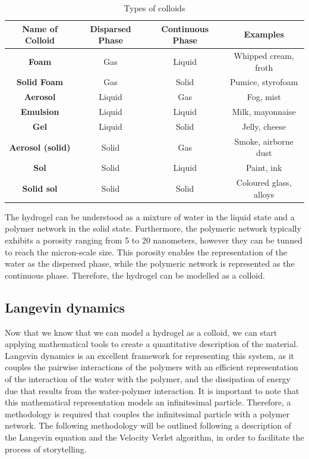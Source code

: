 \begin{table}[ht!]
\begin{tabular}{|c|c|c|c|}
\hline
\textbf{Name of Colloid} & \textbf{Disparsed Phase} & \textbf{Continuous Phase} & \textbf{Examples}      \\ \hline
\textbf{Foam}            & Gas                      & Liquid                    & Whipped cream, froth   \\ \hline
\textbf{Solid Foam}      & Gas                      & Solid                     & Pumice, styrofoam      \\ \hline
\textbf{Aerosol}         & Liquid                   & Gas                       & Fog, mist              \\ \hline
\textbf{Emulsion}        & Liquid                   & Liquid                    & Milk, mayonnaise       \\ \hline
\textbf{Gel}             & Liquid                   & Solid                     & Jelly, cheese          \\ \hline
\textbf{Aerosol (solid)} & Solid                    & Gas                       & Smoke, airborne dust   \\ \hline
\textbf{Sol}             & Solid                    & Liquid                    & Paint, ink             \\ \hline
\textbf{Solid sol}       & Solid                    & Solid                     & Coloured glass, alloys \\ \hline
\end{tabular}
\caption{Types of colloids}\label{tab:colloids}
\end{table}

The hydrogel can be understood as a mixture of water in the liquid state and a polymer network in the solid state.
Furthermore, the polymeric network typically exhibits a porosity ranging from 5 to 20 nanometers, however they can be tunned to reach the micron-scale size.
This porosity enables the representation of the water as the dispersed phase, while the polymeric network is represented as the continuous phase.
Therefore, the hydrogel can be modelled as a colloid.


\subsection{Langevin dynamics}

Now that we know that we can model a hydrogel as a colloid, we can start applying mathematical tools to create a quantitative description of the material.
Langevin dynamics is an excellent framework for representing this system, as it couples 
    the pairwise interactions of the polymers 
    with an efficient representation of the interaction of the water with the polymer, 
    and the dissipation of energy due that results from the water-polymer interaction.
It is important to note that this mathematical representation models an infinitesimal particle.
Therefore, a methodology is required that couples the infinitesimal particle with a polymer network.
The following methodology will be outlined following a description of the Langevin equation and the Velocity Verlet algorithm, in order to facilitate the process of storytelling.

